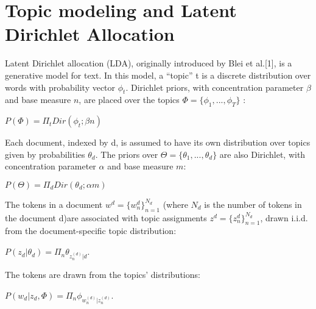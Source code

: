 \documentclass[10pt,a5paper,twoside]{article}
\begin{document}

\section{Topic modeling and Latent Dirichlet Allocation}

Latent Dirichlet allocation (LDA), originally introduced by Blei et al.[1], is a generative model for text. In this model, a “topic” t is a discrete distribution over words with probability vector $\phi_{t}$. Dirichlet
priors, with concentration parameter $\beta$ and base measure $n$, are placed over the topics $\Phi = \lbrace \phi_{1}, ... , \phi_{T} \rbrace $ :

\begin{center}
$P\left( \Phi \right)  = \Pi_{t}  Dir\left(  \phi_{t} ; \beta n  \right) $
\end{center}


Each document, indexed by d, is assumed to have its own distribution over topics given by probabilities $\theta_{d}$. The priors over $\Theta = \lbrace  \theta_{1}, ... , \theta_{d}  \rbrace$ are also Dirichlet, with concentration parameter $\alpha$ and base measure $m$:

\begin{center}
$P\left( \Theta \right)  = \Pi_{d}  Dir\left(  \theta_{d} ; \alpha m  \right) $
\end{center}

The tokens in a document $w^{d} = \lbrace w^{d}_{n} \rbrace^{N_{d}}_{n=1} $ (where $N_d$ is the number of tokens in the document d)are associated with topic assignments $z^{d} = \lbrace z^{d}_{n} \rbrace^{N_{d}}_{n=1} $, drawn i.i.d. from the document-specific topic distribution:
\begin{center}
$P\left( z_{d} | \theta_{d}  \right) = \Pi_{n} \theta_{ z^{\left( d\right) }_{n} | d}$.
\end{center}
The tokens are drawn from the topics’ distributions:
\begin{center}
$P\left( w_{d} | z_{d}, \Phi  \right) = \Pi_{n} \phi_{ w^{\left( d\right) }_{n} | z^{\left( d\right) }_{n}}$.
\end{center}
\end{document}
